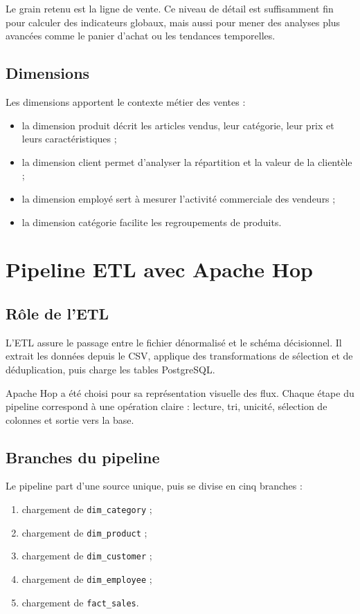 \documentclass[12pt,a4paper,twoside]{report}
\begin{document}
Le grain retenu est la ligne de vente. Ce niveau de détail est suffisamment fin pour calculer des indicateurs globaux, mais aussi pour mener des analyses plus avancées comme le panier d'achat ou les tendances temporelles.

\section{Dimensions}

Les dimensions apportent le contexte métier des ventes :

\begin{itemize}
  \item la dimension produit décrit les articles vendus, leur catégorie, leur prix et leurs caractéristiques ;
  \item la dimension client permet d'analyser la répartition et la valeur de la clientèle ;
  \item la dimension employé sert à mesurer l'activité commerciale des vendeurs ;
  \item la dimension catégorie facilite les regroupements de produits.
\end{itemize}

\chapter{Pipeline ETL avec Apache Hop}

\section{Rôle de l'ETL}

L'ETL assure le passage entre le fichier dénormalisé et le schéma décisionnel. Il extrait les données depuis le CSV, applique des transformations de sélection et de déduplication, puis charge les tables PostgreSQL.

Apache Hop a été choisi pour sa représentation visuelle des flux. Chaque étape du pipeline correspond à une opération claire : lecture, tri, unicité, sélection de colonnes et sortie vers la base.

\section{Branches du pipeline}

Le pipeline part d'une source unique, puis se divise en cinq branches :

\begin{enumerate}
  \item chargement de \texttt{dim\_category} ;
  \item chargement de \texttt{dim\_product} ;
  \item chargement de \texttt{dim\_customer} ;
  \item chargement de \texttt{dim\_employee} ;
  \item chargement de \texttt{fact\_sales}.
\end{enumerate}
\end{document}
